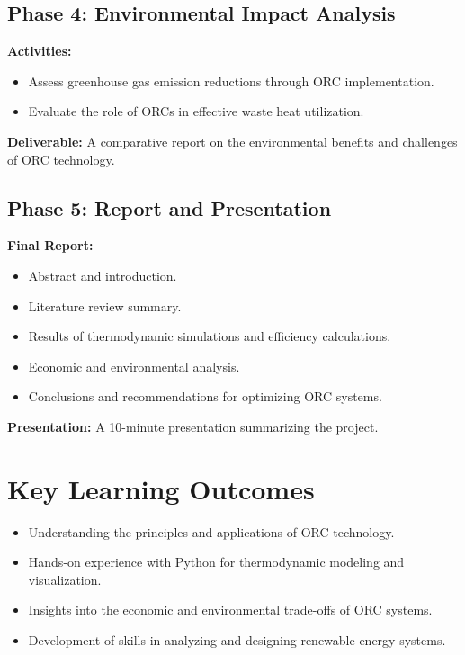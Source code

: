 \documentclass[11pt]{article}
\begin{document}
\subsection*{Phase 4: Environmental Impact Analysis}
\textbf{Activities:}
\begin{itemize}
    \item Assess greenhouse gas emission reductions through ORC implementation.
    \item Evaluate the role of ORCs in effective waste heat utilization.
\end{itemize}
\textbf{Deliverable:} A comparative report on the environmental benefits and challenges of ORC technology.

\subsection*{Phase 5: Report and Presentation}
\textbf{Final Report:}
\begin{itemize}
    \item Abstract and introduction.
    \item Literature review summary.
    \item Results of thermodynamic simulations and efficiency calculations.
    \item Economic and environmental analysis.
    \item Conclusions and recommendations for optimizing ORC systems.
\end{itemize}
\textbf{Presentation:} A 10-minute presentation summarizing the project.

\section*{Key Learning Outcomes}
\begin{itemize}
    \item Understanding the principles and applications of ORC technology.
    \item Hands-on experience with Python for thermodynamic modeling and visualization.
    \item Insights into the economic and environmental trade-offs of ORC systems.
    \item Development of skills in analyzing and designing renewable energy systems.
\end{itemize}
\end{document}
